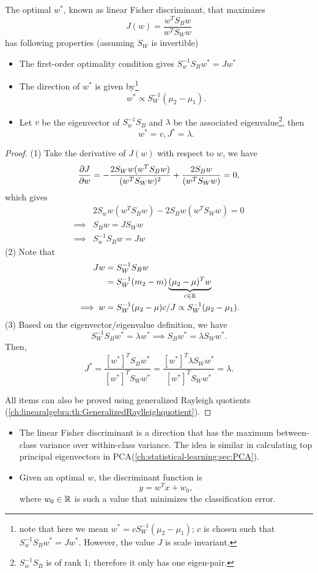 \begin{refsection}
\begin{lemma}\cite[186]{bishop2006pattern}\label{ch:statistical-learning:th:OptimalityConditionFisherCriterion}
	The optimal $w^*$, known as linear Fisher discriminant, that maximizes
	$$J(w) = \frac{w^TS_Bw}{w^TS_Ww}$$
	has following properties (assuming $S_W$ is invertible)
\begin{itemize}
	\item The first-order optimality condition gives $S_w^{-1}S_Bw^* = Jw^*$
	\item The direction of $w^*$ is given by\footnote{note that here we mean $w^* = c S_W^{-1}(\mu_2 - \mu_1)$; $c$ is chosen such that $S_w^{-1}S_Bw^* = Jw^*$. However, the value $J$ is scale invariant.}
	$$w^* \propto S_W^{-1}(\mu_2 - \mu_1).$$
	\item Let $v$ be the eigenvector of $S_w^{-1}S_B$ and $\lambda$ be the associated eigenvalue\footnote{$S_w^{-1}S_B$ is of rank 1; therefore it only has one eigen-pair.}, then 
	$$w^* = v, J^*=\lambda.$$
\end{itemize}	
\end{lemma}
\begin{proof}
(1)	
	Take the derivative of $J(w)$ with respect to $w$, we have
	$$\frac{\partial J}{\partial w} = -\frac{2S_Ww(w^TS_Bw)}{(w^TS_Ww)^2} + \frac{2S_Bw}{(w^TS_Ww)} = 0,$$
	which gives
	\begin{align*}
	&2S_ww(w^TS_Bw) - 2S_Bw(w^TS_Ww) = 0 \\
	\implies& S_Bw = JS_Ww \\
	\implies& S_w^{-1}S_Bw = Jw
	\end{align*}
(2)	
Note that
\begin{align*}
Jw &= S_W^{-1}S_Bw\\
   &= S_W^{-1}(m_2 - m)\underbrace{(\mu_2-\mu)^Tw}_{c\in\mathbb{R}}\\
\implies w &=  S_W^{-1}(\mu_2 - \mu)c/J   \propto S_W^{-1} (\mu_2-\mu_1).
\end{align*}
(3)
Based on the eigenvector/eigenvalue definition, we have
$$S_W^{-1}S_B w^* = \lambda w^* \implies S_B w^* = \lambda S_W w^*.$$
Then, 
$$J^* = \frac{[w^*]^TS_Bw^*}{[w^*]^TS_Ww^*} = \frac{[w^*]^T\lambda S_W w^*}{[w^*]^TS_Ww^*} = \lambda. $$

All items can also be proved using generalized Rayleigh quotients (\autoref{ch:linearalgebra:th:GeneralizedRaylleighquotient}).
\end{proof}

\begin{remark}[interpretation]\hfill
	\begin{itemize}
		\item The linear Fisher discriminant is a direction that has the maximum between-class variance over within-class variance. The idea is similar in calculating top principal eigenvectors in PCA(\autoref{ch:statistical-learning:sec:PCA}).
		\item Given an optimal $w$, the discriminant function is $$y = w^Tx + w_0,$$
		where $w_0\in\mathbb{R}$ is such a value that minimizes the classification error.
	\end{itemize}
\end{remark}





\end{refsection}
